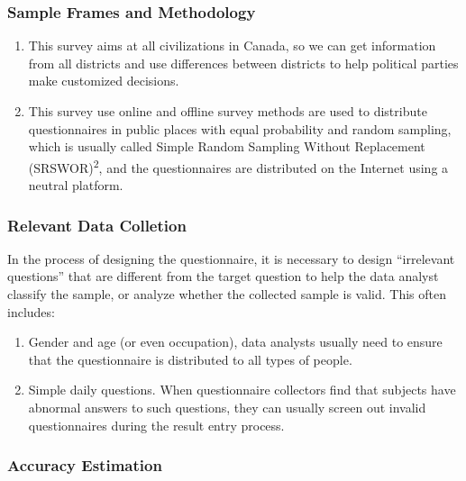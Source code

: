 \documentclass[
]{article}
\begin{document}
\hypertarget{sample-frames-and-methodology}{%
\subsubsection{Sample Frames and
Methodology}\label{sample-frames-and-methodology}}

\begin{enumerate}
\def\labelenumi{\arabic{enumi}.}
\item
  This survey aims at all civilizations in Canada, so we can get
  information from all districts and use differences between districts
  to help political parties make customized decisions.
\item
  This survey use online and offline survey methods are used to
  distribute questionnaires in public places with equal probability and
  random sampling, which is usually called Simple Random Sampling
  Without Replacement (SRSWOR)\textsuperscript{2}, and the
  questionnaires are distributed on the Internet using a neutral
  platform.
\end{enumerate}

\hypertarget{relevant-data-colletion}{%
\subsubsection{Relevant Data Colletion}\label{relevant-data-colletion}}

In the process of designing the questionnaire, it is necessary to design
``irrelevant questions'' that are different from the target question to
help the data analyst classify the sample, or analyze whether the
collected sample is valid. This often includes:

\begin{enumerate}
\def\labelenumi{\arabic{enumi}.}
\item
  Gender and age (or even occupation), data analysts usually need to
  ensure that the questionnaire is distributed to all types of people.
\item
  Simple daily questions. When questionnaire collectors find that
  subjects have abnormal answers to such questions, they can usually
  screen out invalid questionnaires during the result entry process.
\end{enumerate}

\hypertarget{accuracy-estimation}{%
\subsubsection{Accuracy Estimation}\label{accuracy-estimation}}
\end{document}
